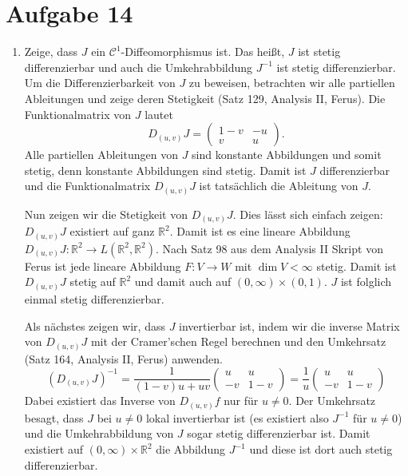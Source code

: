\documentclass[a4paper,DIV=1]{article}
\theoremstyle{plain}
\begin{document}
\section*{Aufgabe 14}
\begin{enumerate}
	\item Zeige, dass $J$ ein $\mathcal C^1$-Diffeomorphismus ist. Das heißt, $J$ ist stetig differenzierbar und auch die Umkehrabbildung $J^{-1}$ ist stetig differenzierbar. Um die Differenzierbarkeit von $J$ zu beweisen, betrachten wir alle partiellen Ableitungen und zeige deren Stetigkeit (Satz 129, Analysis II, Ferus). Die Funktionalmatrix von $J$ lautet
	\[
		D_{(u,v)}J =
		\begin{pmatrix}
			1-v & -u \\ v & u
		\end{pmatrix}.
	\]
	Alle partiellen Ableitungen von $J$ sind konstante Abbildungen und somit stetig, denn konstante Abbildungen sind stetig. Damit ist $J$ differenzierbar und die Funktionalmatrix $D_{(u,v)}J$ ist tatsächlich die Ableitung von $J$. 
	
	Nun zeigen wir die Stetigkeit von $D_{(u,v)}J$. Dies lässt sich einfach zeigen: $D_{(u,v)}J$ existiert auf ganz $\mathbb R^2$. Damit ist es eine lineare Abbildung $D_{(u,v)}J : \mathbb R^2 \to L(\mathbb R^2, \mathbb R^2)$. Nach Satz 98 aus dem Analysis II Skript von Ferus ist jede lineare Abbildung $F: V \to W$ mit $\dim V < \infty$ stetig. Damit ist $D_{(u,v)}J$ stetig auf $\mathbb R^2$ und damit auch auf $(0,\infty) \times (0,1)$. $J$ ist folglich einmal stetig differenzierbar.
	
	Als nächstes zeigen wir, dass $J$ invertierbar ist, indem wir die inverse Matrix von $D_{(u,v)}J$ mit der Cramer'schen Regel berechnen und den Umkehrsatz (Satz 164, Analysis II, Ferus) anwenden.
	\[
		(D_{(u,v)}J)^{-1} = \frac{1}{(1-v)u +uv} \begin{pmatrix} 
			u & u \\ -v & 1-v
		\end{pmatrix} = \frac{1}{u}\begin{pmatrix} 
		u & u \\ -v & 1-v
		\end{pmatrix}
	\]
	Dabei existiert das Inverse von $D_{(u,v)}f$ nur für $u \neq 0$. Der Umkehrsatz besagt, dass $J$ bei $u \neq 0$ lokal invertierbar ist (es existiert also $J^{-1}$ für $u \neq 0$) und die Umkehrabbildung von $J$ sogar stetig differenzierbar ist. Damit existiert auf $(0,\infty) \times \mathbb R^2$ die Abbildung $J^{-1}$ und diese ist dort auch stetig differenzierbar.
	

\end{enumerate}
\end{document}
